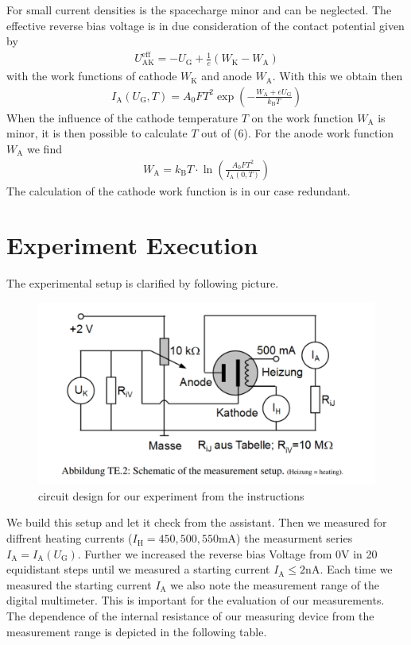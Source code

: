 \documentclass[a4paper, 12pt]{scrartcl}
\begin{document}
\newline 
\newline 
For small current densities is the spacecharge minor and can be neglected. The effective reverse bias voltage is in due consideration of the contact potential given by 
\begin{align}
U_{\textrm{AK}}^{\textrm{eff}} = -U_\textrm{G} + \frac{1}{e}(W_\textrm{K}-W_\textrm{A})
\end{align}
with the work functions of cathode $W_\textrm{K}$ and anode $W_{\textrm{A}}$. With this we obtain then 
\begin{align}
I_\textrm{A} (U_\textrm{G},T) = A_0 F T^2 \exp \left( - \frac{W_\textrm{A} + e U_\textrm{G}}{k_\textrm{B} T } \right)
\end{align}
When the influence of the cathode temperature $T$ on the work function $W_\textrm{A}$ is minor, it is then possible to calculate $T$ out of (6). For the anode work function $W_\textrm{A}$ we find
\begin{align}
W_\textrm{A} = k_\textrm{B} T \cdot \ln \left( \frac{A_0 F T^2}{I_\textrm{A}(0,T)} \right)
\end{align}
The calculation of the cathode work function is in our case redundant. 
\section{Experiment Execution}
The experimental setup is clarified by following picture. 
\begin{figure}[H]\includegraphics[scale=0.7]{TEpic1}\caption{circuit design for our experiment from the instructions}\end{figure}
We build this setup and let it check from the assistant. Then we measured for diffrent heating currents ($I_\textrm{H} = 450,500,550 \textrm{mA}$) the measurment series $I_\textrm{A} = I_\textrm{A}(U_\textrm{G})$. Further we increased the reverse bias Voltage from 0V in 20 equidistant steps until we measured a starting current $I_\textrm{A} \leq 2$nA. Each time we measured the starting current $I_\textrm{A}$ we also note the measurement range of the digital multimeter. This is important for the evaluation of our measurements. The dependence of the internal resistance of our measuring device from the measurement range is depicted in the following table.
\end{document}
